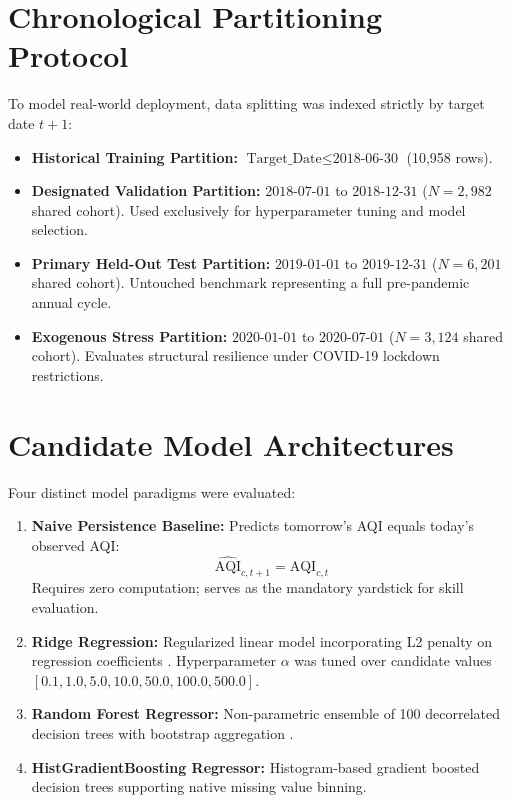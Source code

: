 \documentclass[11pt,a4paper]{report}
\begin{document}
\section{Chronological Partitioning Protocol}
To model real-world deployment, data splitting was indexed strictly by target date $t+1$:
\begin{itemize}
    \item \textbf{Historical Training Partition:} $\text{Target\_Date} \le \text{2018-06-30}$ (10,958 rows).
    \item \textbf{Designated Validation Partition:} $\text{2018-07-01}$ to $\text{2018-12-31}$ ($N=2,982$ shared cohort). Used exclusively for hyperparameter tuning and model selection.
    \item \textbf{Primary Held-Out Test Partition:} $\text{2019-01-01}$ to $\text{2019-12-31}$ ($N=6,201$ shared cohort). Untouched benchmark representing a full pre-pandemic annual cycle.
    \item \textbf{Exogenous Stress Partition:} $\text{2020-01-01}$ to $\text{2020-07-01}$ ($N=3,124$ shared cohort). Evaluates structural resilience under COVID-19 lockdown restrictions.
\end{itemize}

\section{Candidate Model Architectures}
Four distinct model paradigms were evaluated:
\begin{enumerate}
    \item \textbf{Naive Persistence Baseline:} Predicts tomorrow's AQI equals today's observed AQI:
    $$\widehat{\text{AQI}}_{c, t+1} = \text{AQI}_{c, t}$$
    Requires zero computation; serves as the mandatory yardstick for skill evaluation.
    \item \textbf{Ridge Regression:} Regularized linear model incorporating L2 penalty on regression coefficients \cite{hoerl1970ridge}. Hyperparameter $\alpha$ was tuned over candidate values $[0.1, 1.0, 5.0, 10.0, 50.0, 100.0, 500.0]$.
    \item \textbf{Random Forest Regressor:} Non-parametric ensemble of 100 decorrelated decision trees with bootstrap aggregation \cite{breiman2001random}.
    \item \textbf{HistGradientBoosting Regressor:} Histogram-based gradient boosted decision trees supporting native missing value binning.
\end{enumerate}
\end{document}
